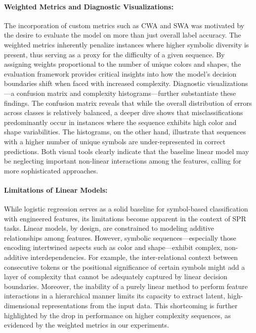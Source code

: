 \documentclass{article}
\begin{document}
\paragraph{Weighted Metrics and Diagnostic Visualizations:} The incorporation of custom metrics such as CWA and SWA was motivated by the desire to evaluate the model on more than just overall label accuracy. The weighted metrics inherently penalize instances where higher symbolic diversity is present, thus serving as a proxy for the difficulty of a given sequence. By assigning weights proportional to the number of unique colors and shapes, the evaluation framework provides critical insights into how the model's decision boundaries shift when faced with increased complexity. Diagnostic visualizations—a confusion matrix and complexity histograms—further substantiate these findings. The confusion matrix reveals that while the overall distribution of errors across classes is relatively balanced, a deeper dive shows that misclassifications predominantly occur in instances where the sequence exhibits high color and shape variabilities. The histograms, on the other hand, illustrate that sequences with a higher number of unique symbols are under-represented in correct predictions. Both visual tools clearly indicate that the baseline linear model may be neglecting important non-linear interactions among the features, calling for more sophisticated approaches.

\paragraph{Limitations of Linear Models:} While logistic regression serves as a solid baseline for symbol-based classification with engineered features, its limitations become apparent in the context of SPR tasks. Linear models, by design, are constrained to modeling additive relationships among features. However, symbolic sequences—especially those encoding intertwined aspects such as color and shape—exhibit complex, non-additive interdependencies. For example, the inter-relational context between consecutive tokens or the positional significance of certain symbols might add a layer of complexity that cannot be adequately captured by linear decision boundaries. Moreover, the inability of a purely linear method to perform feature interactions in a hierarchical manner limits its capacity to extract latent, high-dimensional representations from the input data. This shortcoming is further highlighted by the drop in performance on higher complexity sequences, as evidenced by the weighted metrics in our experiments.
\end{document}
